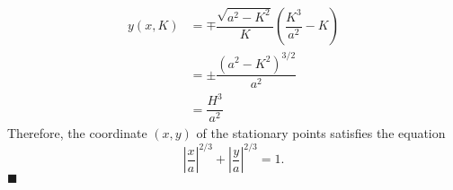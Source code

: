 \documentclass[twocolumn]{article}
\begin{document}
$$ \begin{aligned}
	y(x, K) &= \mp \dfrac{\sqrt{a^2-K^2}}{K}\left(\dfrac{K^3}{a^2}-K\right)\\
	& = \pm \dfrac{\left( a^2- K^2 \right)^{3/2}}{a^2}\\
	& = \dfrac{H^3}{a^2}
\end{aligned}
$$
Therefore, the coordinate $(x, y)$ of the stationary points satisfies the equation
$$ \left|\dfrac{x}{a}\right|^{2/3} + \left|\dfrac{y}{a}\right|^{2/3} = 1. $$
$\blacksquare$
\end{document}

